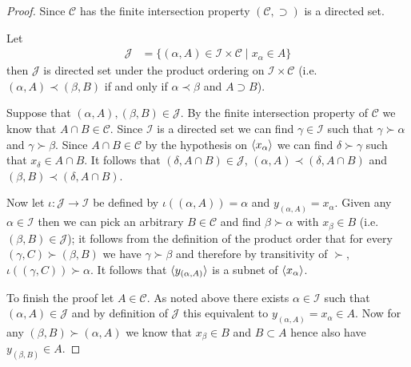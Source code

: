 \begin{proof}
Since $\mathcal{C}$ has the finite intersection property $(\mathcal{C}, \supset)$ is a directed set.  
\begin{clm}Let 
\begin{align*}
\mathcal{J} &= \lbrace (\alpha, A) \in \mathcal{I} \times \mathcal{C} \mid x_\alpha \in A \rbrace
\end{align*}
then $\mathcal{J}$ is directed set under the product ordering on $\mathcal{I} \times \mathcal{C}$ (i.e. $(\alpha,A) \prec (\beta, B)$ if and only if $\alpha \prec \beta$ and $A \supset B$).
\end{clm}
Suppose that $(\alpha, A), (\beta, B) \in \mathcal{J}$.  By the finite intersection property of $\mathcal{C}$ we know that $A \cap B \in \mathcal{C}$.  Since $\mathcal{I}$ is a directed set we can find
$\gamma \in \mathcal{I}$ such that $\gamma \succ \alpha$ and $\gamma \succ \beta$.  Since $A \cap B \in \mathcal{C}$ by the hypothesis on $\langle x_{\alpha} \rangle$ we can find $\delta \succ \gamma$ such that $x_\delta \in A \cap B$.  It follows that $(\delta, A \cap B) \in \mathcal{J}$, $(\alpha, A) \prec (\delta, A \cap B)$ and $(\beta, B) \prec (\delta, A \cap B)$.

Now let $\iota : \mathcal{J} \to \mathcal{I}$ be defined by $\iota((\alpha, A)) = \alpha$ and $y_{(\alpha,A)} = x_\alpha$.  Given any $\alpha \in \mathcal{I}$ then we can pick an arbitrary $B \in \mathcal{C}$ and find $\beta \succ \alpha$ with $x_\beta \in B$ (i.e. $(\beta, B) \in \mathcal{J}$); it follows from the definition of the product order that for every $(\gamma,C) \succ (\beta,B)$ we have $\gamma \succ \beta$ and therefore by transitivity of $\succ$, $\iota((\gamma,C)) \succ \alpha$.  It follows that $\langle y_{(\alpha,A)} \rangle$ is a subnet of $\langle x_{\alpha} \rangle$.  

To finish the proof let $A \in \mathcal{C}$.  As noted above there exists $\alpha \in \mathcal{I}$ such that $(\alpha, A) \in \mathcal{J}$ and by definition of $\mathcal{J}$ this equivalent to $y_{(\alpha,A)} = x_\alpha \in A$.  Now for any $(\beta, B) \succ (\alpha, A)$ we know that $x_\beta \in B$ and $B \subset A$ hence also have $y_{(\beta,B)} \in A$.
\end{proof}

